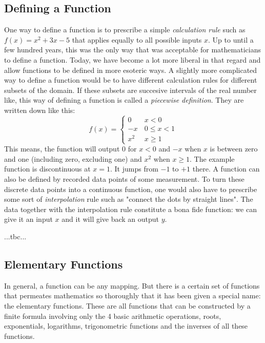 \subsection{Defining a Function}
One way to define a function is to prescribe a simple \emph{calculation rule} such as $f(x) = x^2 + 3 x - 5$ that applies equally to all possible inputs $x$. Up to until a few hundred years, this was the only way that was acceptable for mathematicians to define a function. Today, we have become a lot more liberal in that regard and allow functions to be defined in more esoteric ways. A slightly more complicated way to define a function would be to have different calculation rules for different subsets of the domain. If these subsets are succesive intervals of the real number like, this way of defining a function is called a \emph{piecewise definition}. They are written down like this:
\begin{equation}
f(x) = 
\begin{cases} 
 0 \quad& x < 0 \\
 -x     & 0   \leq x < 1 \\
 x^2    & x \geq 1
\end{cases}
\end{equation}
This means, the function will output $0$ for $x < 0$ and $-x$ when $x$ is between zero and one (including zero, excluding one) and $x^2$ when $x \geq 1$. The example function is discontinuous at $x=1$. It jumps from $-1$ to $+1$ there. A function can also be defined by recorded data points of some measurement. To turn these discrete data points into a continuous function, one would also have to prescribe some sort of \emph{interpolation} rule such as "connect the dots by straight lines". The data together with the interpolation rule constitute a bona fide function: we can give it an input $x$ and it will give back an output $y$. 


...tbc...



\subsection{Elementary Functions}
In general, a function can be any mapping. But there is a certain set of functions that permeates mathematics so thoroughly that it has been given a special name: the elementary functions. These are all functions that can be constructed by a finite formula involving only the 4 basic arithmetic operations, roots, exponentials, logarithms, trigonometric functions and the inverses of all these functions.

